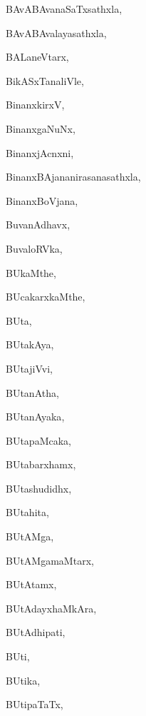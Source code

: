 \begin{multicols}{3}
{\noindent
{BAvABAvanaSaTxsathxla}, \pageref{BAvABAvanaSaTxsathxla}

\noindent
{BAvABAvalayasathxla}, \pageref{BAvABAvalayasathxla}

\noindent
{BALaneVtarx}, \pageref{BALaneVtarx}

\noindent
{BikASxTanaliVle}, \pageref{BikASxTanaliVle}

\noindent
{BinanxkirxV}, \pageref{BinanxkirxV}

\noindent
{BinanxgaNuNx}, \pageref{BinanxgaNuNx}

\noindent
{BinanxjAcnxni}, \pageref{BinanxjAcnxni}

\noindent
{BinanxBAjananirasanasathxla}, \pageref{BinanxBAjananirasanasathxla}

\noindent
{BinanxBoVjana}, \pageref{BinanxBoVjana}

\noindent
{BuvanAdhavx}, \pageref{BuvanAdhavx}

\noindent
{BuvaloRVka}, \pageref{BuvaloRVka}

\noindent
{BUkaMthe}, \pageref{BUkaMthe}

\noindent
{BUcakarxkaMthe}, \pageref{BUcakarxkaMthe}

\noindent
{BUta}, \pageref{BUta}

\noindent
{BUtakAya}, \pageref{BUtakAya}

\noindent
{BUtajiVvi}, \pageref{BUtajiVvi}

\noindent
{BUtanAtha}, \pageref{BUtanAtha}

\noindent
{BUtanAyaka}, \pageref{BUtanAyaka}

\noindent
{BUtapaMcaka}, \pageref{BUtapaMcaka}

\noindent
{BUtabarxhamx}, \pageref{BUtabarxhamx}

\noindent
{BUtashudidhx}, \pageref{BUtashudidhx}

\noindent
{BUtahita}, \pageref{BUtahita}

\noindent
{BUtAMga}, \pageref{BUtAMga}

\noindent
{BUtAMgamaMtarx}, \pageref{BUtAMgamaMtarx}

\noindent
{BUtAtamx}, \pageref{BUtAtamx}

\noindent
{BUtAdayxhaMkAra}, \pageref{BUtAdayxhaMkAra}

\noindent
{BUtAdhipati}, \pageref{BUtAdhipati}

\noindent
{BUti}, \pageref{BUti}

\noindent
{BUtika}, \pageref{BUtika}

\noindent
{BUtipaTaTx}, \pageref{BUtipaTaTx}

}
\end{multicols}
